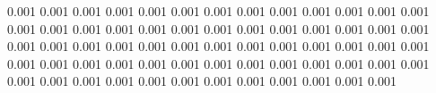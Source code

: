 0.001      0.001      %
0.001      0.001      %
0.001      0.001      %
0.001      0.001      %
0.001      0.001      %
0.001      0.001      %
0.001      0.001      %
0.001      0.001      %
0.001      0.001      %
0.001      0.001      %
0.001      0.001      %
0.001      0.001      %
0.001      0.001      %
0.001      0.001      %
0.001      0.001      %
0.001      0.001      %
0.001      0.001      %
0.001      0.001      %
0.001      0.001      %
0.001      0.001      %
0.001      0.001      %
0.001      0.001      %
0.001      0.001      %
0.001      0.001      %
0.001      0.001      %
0.001      0.001      %
0.001      0.001      %
0.001      0.001      %
0.001      0.001      %
0.001      0.001      %
0.001      0.001      %
0.001      0.001      %
